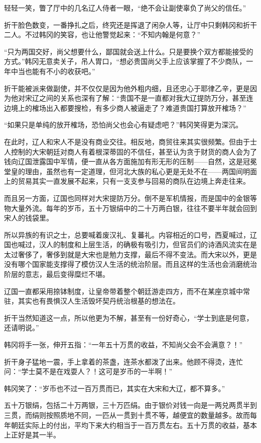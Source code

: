 轻轻一笑，瞥了厅中的几名辽人侍者一眼，“绝不会让副使辜负了尚父的信任。”

折干脸色数变，一番挣扎之后，终究还是挥退了闲杂人等，让厅中只剩韩冈和折干二人。不过韩冈的笑容，也让他警觉起来：“不知内翰是何意？”

“只为两国交好，尚父想要什么，鄙国就会送上什么。只是要换个双方都能接受的方式。”韩冈无意卖关子，吊人胃口，“想必贵国尚父手上应该掌握了不少商队，一年中当也能有不小的收获吧。”

折干能被派来做副使，并不仅仅是因为他外粗内细，且还忠心于耶律乙辛，更是因为他对宋辽之间的关系也深有了解：“贵国不是一直都对我大辽提防万分，甚至连边境上的榷场出入都要搜检，有多少商人被逼走了？难道贵国打算放开榷场？”

“如果只是单纯的放开榷场，恐怕尚父也会心有疑虑吧？”韩冈笑得更为深沉。

在此时，辽人和宋人不是没有商业交往。相反地，商贸往来其实很频繁。但由于士人控制的大宋朝廷对商人有着根深蒂固的不信任，甚至认为贪于财货的商人会为了钱向辽国泄露国中军情，便一直从各方面施加有形无形的压制——自然，这是冠冕堂皇的理由，虽然也有一定道理，但河北大族的私心更是无处不在——两国间明面上的贸易其实一直发展不起来，只有一支支参与回易的商队在边境上奔走往来。

而且另一方面，辽国也同样对大宋提防万分。倒不是军机情报，而是国中的金银等物大量外流。每年的岁币，五十万银绢中的二十万两白银，往往不要半年就会回到宋人的钱袋里。

所以异族的有识之士，总要喊着废汉礼、复蕃礼。内容相近的口号，西夏喊过，辽国也喊过，汉人的制度和上层生活，的确极有吸引力，但官员们的诗酒风流实在是太过奢侈了，奢侈到就是大宋也是勉力支撑，最后不得不变法。而大宋以外，更是没有哪个国家能支撑得了模仿汉人生活的统治阶层。而且这样的生活也会消磨统治阶层的意志，最后变得糜烂不堪。

辽国一直都采用捺钵制度，让皇帝带着整个朝廷游走四方，而不在某座京城中常驻，其实也有畏惧汉人生活毁坏契丹统治根基的想法在。

折干当然知道这一点，所以他更为不解，甚至有一份好奇心，“学士到底是何意，还请明说。”

韩冈将手一张，伸开五指：“一年五十万贯的收益，不知尚父会不会满意？！”

折干身子猛地一震，手上拿着的茶盏，连茶水都泼了出来。他顾不得烫，连忙问：“学士莫不是在戏耍人？！这可是岁币的一半啊！”

韩冈笑了：“岁币也不过一百万贯而已，其实在大宋和大辽，都不算多。”

五十万银绢，包括二十万两银，三十万匹绢。由于银价对钱一向是一两兑两贯半到三贯，而绢则按照质地不同，一匹从一贯到十贯不等，越便宜的数量越多。故而每年朝廷实际上的付出，平均下来大约相当于一百万贯左右。五十万贯的收益，基本上正好是其一半。

